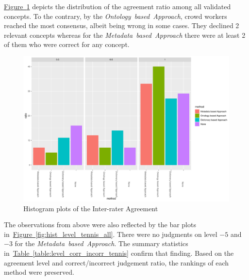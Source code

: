 \hyperref[fig:hist_agreement_tennis_all]{Figure~\ref*{fig:hist_agreement_tennis_all}} depicts the distribution of the agreement ratio among all validated concepts. To the contrary, by the \emph{Ontology~based~Approach}, crowd workers reached the most consensus, albeit being wrong in some cases. They declined 2 relevant concepts whereas for the \emph{Metadata~based~Approach} there were at least 2 of them who were correct for any concept. 
\begin{figure}
  	 \includegraphics[width=\textwidth]{plots/tennis/hist_agreement_corrected}
  	 \caption{Histogram plots of the Inter-rater Agreement}\label{fig:hist_agreement_tennis_all}
\end{figure}

The observations from above were also reflected by the bar plots in~\hyperref[fig:hist_level_tennis_all]{Figure~\ref*{fig:hist_level_tennis_all}}. 
There were no judgments on level $-5$ and $-3$ for the \emph{Metadata~based~Approach}.
The summary statistics in~\hyperref[table:level_corr_incorr_tennis]{Table~\ref*{table:level_corr_incorr_tennis}} confirm that finding. Based on the agreement level and correct/incorrect judgement ratio, the rankings of each method were preserved. 
 
